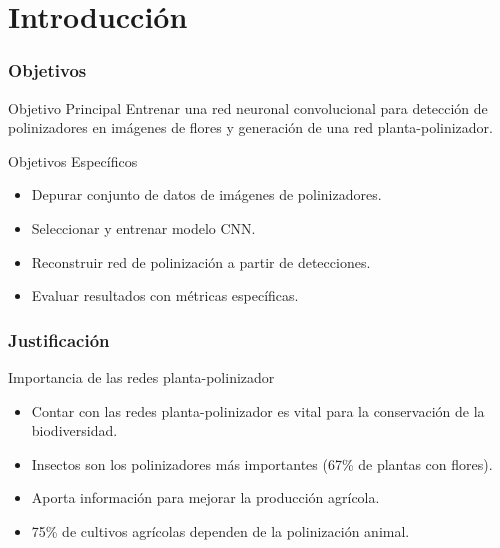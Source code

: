 \section{Introducción}
    
\begin{frame}
    \frametitle{Objetivos}
    \begin{block}{Objetivo Principal}
        Entrenar una red neuronal convolucional para detección de polinizadores en imágenes de flores y generación de una red planta-polinizador.
    \end{block}
    \pause
    \begin{block}{Objetivos Específicos}
        \begin{itemize}
            \item Depurar conjunto de datos de imágenes de polinizadores.
            \item Seleccionar y entrenar modelo CNN.
            \item Reconstruir red de polinización a partir de detecciones.
            \item Evaluar resultados con métricas específicas.
        \end{itemize}
    \end{block}
\end{frame}

\begin{frame}
    \frametitle{Justificación}
    \begin{block}{Importancia de las redes planta-polinizador}
        \begin{itemize}
            \item Contar con las redes planta-polinizador es vital para la conservación de la biodiversidad.
            \item Insectos son los polinizadores más importantes (67\% de plantas con flores).
            \item Aporta información para mejorar la producción agrícola.
            \item 75\% de cultivos agrícolas dependen de la polinización animal.
        \end{itemize}
    \end{block}
\end{frame}
    
